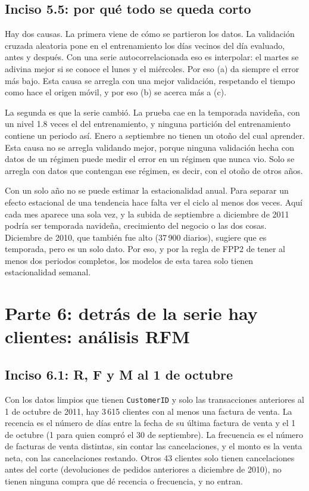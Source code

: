 \documentclass[11pt]{article}
\begin{document}
\subsection*{Inciso 5.5: por qué todo se queda corto}

Hay dos causas. La primera viene de cómo se partieron los datos. La validación cruzada
aleatoria pone en el entrenamiento los días vecinos del día evaluado, antes y después. Con una
serie autocorrelacionada eso es interpolar: el martes se adivina mejor si se conoce el lunes y el
miércoles. Por eso (a) da siempre el error más bajo. Esta causa se arregla con una mejor
validación, respetando el tiempo como hace el origen móvil, y por eso (b) se acerca más a (c).

La segunda es que la serie cambió. La prueba cae en la temporada navideña, con un nivel
1.8 veces el del entrenamiento, y ninguna partición del entrenamiento contiene un periodo así.
Enero a septiembre no tienen un otoño del cual aprender. Esta causa no se arregla validando
mejor, porque ninguna validación hecha con datos de un régimen puede medir el error en un régimen
que nunca vio. Solo se arregla con datos que contengan ese régimen, es decir, con el otoño de
otros años.

Con un solo año no se puede estimar la estacionalidad anual. Para separar un efecto
estacional de una tendencia hace falta ver el ciclo al menos dos veces. Aquí cada mes aparece una
sola vez, y la subida de septiembre a diciembre de 2011 podría ser temporada navideña, crecimiento
del negocio o las dos cosas. Diciembre de 2010, que también fue alto (\textsterling{}37\,900 diarios), sugiere que
es temporada, pero es un solo dato. Por eso, y por la regla de FPP2 de tener al menos dos periodos
completos, los modelos de esta tarea solo tienen estacionalidad semanal.

\section*{Parte 6: detrás de la serie hay clientes: análisis RFM}

\subsection*{Inciso 6.1: R, F y M al 1 de octubre}

Con los datos limpios que tienen \texttt{CustomerID} y solo las transacciones anteriores al 1 de
octubre de 2011, hay 3\,615 clientes con al menos una factura de venta. La recencia es el
número de días entre la fecha de su última factura de venta y el 1 de octubre (1 para quien
compró el 30 de septiembre). La frecuencia es el número de facturas de venta distintas, sin
contar las cancelaciones, y el monto es la venta neta, con las cancelaciones restando. Otros 43
clientes solo tienen cancelaciones antes del corte (devoluciones de pedidos anteriores a diciembre
de 2010), no tienen ninguna compra que dé recencia o frecuencia, y no entran.
\end{document}
